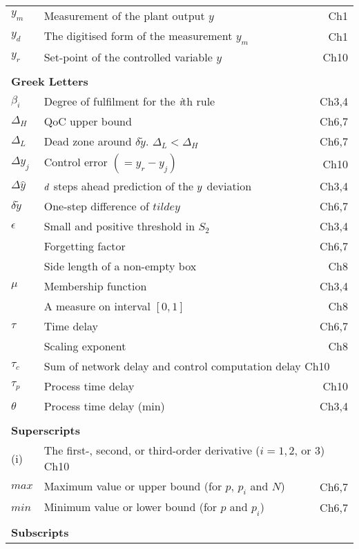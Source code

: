{\begin{longtable}{llr}
$y_m$& Measurement of the plant output $y$ & Ch1\\
$y_d$ & The digitised form of the measurement $y_m$ & Ch1\\
$y_r$ & Set-point of the controlled variable $y$ & Ch10\\
\\
\multicolumn{2}{l}{\textbf{Greek Letters}} & \\
{$\beta_i$} & {Degree of fulfilment for the \textit{i}th rule}& Ch3,4\\
$\Delta_H$ & QoC upper bound & Ch6,7\\
$\Delta_L$ & Dead zone around $\delta\tilde{y}$. $\Delta_L < \Delta_H$ & Ch6,7\\
$\Delta y_j$ & Control error $(= y_r - y_j)$ & Ch10\\
{$\Delta \hat{y}$} & {$d\/$ steps ahead prediction of the $y\/$ deviation}& Ch3,4\\
$\delta\tilde{y}$ & One-step difference of $tilde{y}$ & Ch6,7\\
{$\epsilon$} & {Small and positive threshold in $S_2$}& Ch3,4\\
					   & Forgetting factor & Ch6,7\\
					   & Side length of a non-empty box & Ch8\\
{$\mu$} & {Membership function}& Ch3,4\\
        & A measure on interval $[0, 1]$ & Ch8\\
$\tau$ & Time delay & Ch6,7\\
       & Scaling exponent & Ch8\\
$\tau_c$ & \multicolumn{2}{l}{Sum of network delay and control computation delay \hfill Ch10}\\
$\tau_p$ & Process time delay & Ch10\\
{$\theta$} & {Process time delay (min)}& Ch3,4\\
\\
\multicolumn{2}{l}{\textbf{Superscripts}}\\
(i) & \multicolumn{2}{l}{The first-, second, or third-order derivative ($i=1, 2$, or $3$) \hfill Ch10}\\
$max$ & Maximum value or upper bound (for $p$, $p_i$ and $N$) & Ch6,7\\
$min$ & Minimum value or lower bound (for $p$ and $p_i$) & Ch6,7\\
\\
\multicolumn{3}{l}{\textbf{Subscripts}}\\

\end{longtable}}
